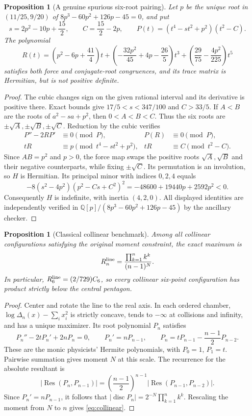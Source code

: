 \documentclass[11pt]{article}
\newtheorem{proposition}[theorem]{Proposition}
\theoremstyle{remark}
\newcommand{\Q}{\mathbb Q}
\numberwithin{equation}{section}
\begin{document}
\begin{proposition}[A genuine spurious six-root pairing]
Let $p$ be the unique root in $(11/25,9/20)$ of
$8p^3-60p^2+126p-45=0$, and put
\[
 s=2p^2-10p+\frac{15}{2},\qquad C=\frac{15}{2}-2p,
 \qquad P(t)=(t^4-st^2+p^2)(t^2-C).
\]
The polynomial
\[
 R(t)=\left(p^2-6p+\frac{41}{4}\right)t
   +\left(-\frac{32p^2}{45}+4p-\frac{26}{5}\right)t^3
   +\left(\frac{29}{75}-\frac{4p^2}{225}\right)t^5
\]
satisfies both force and conjugate-root congruences, and its trace
matrix is Hermitian, but is not positive definite.
\end{proposition}
\begin{proof}
The cubic changes sign on the given rational interval and its
 derivative is positive there. Exact bounds give
$17/5<s<347/100$ and $C>33/5$.
If $A<B$ are the roots of $a^2-sa+p^2$, then $0<A<B<C$.
Thus the six roots are $\pm\sqrt A,\pm\sqrt B,\pm\sqrt C$.
Reduction by the cubic verifies
\begin{align*}
 P''-2RP'&\equiv0\pmod P,&P(R)&\equiv0\pmod P,\\
 tR&\equiv p\pmod{t^4-st^2+p^2},&
 tR&\equiv C\pmod{t^2-C}.
\end{align*}
Since $AB=p^2$ and $p>0$, the force map swaps the positive roots
$\sqrt A,\sqrt B$ and their negative counterparts, while fixing
$\pm\sqrt C$. Its permutation is an involution, so $H$ is Hermitian.
Its principal minor with indices $0,2,4$ equals
\[
 -8(s^2-4p^2)(p^2-Cs+C^2)^2
       =-48600+19440p+2592p^2<0.
\]
Consequently $H$ is indefinite, with inertia $(4,2,0)$.
All displayed identities are independently verified in
$\Q[p]/(8p^3-60p^2+126p-45)$ by the ancillary checker.
\end{proof}

\begin{proposition}[Classical collinear benchmark]\label{prop:collinear}
Among all collinear configurations satisfying the original moment
constraint, the exact maximum is
\begin{equation}\label{eq:collinear}
 R_n^{\rm line}=\frac{\prod_{k=1}^n k^k}{(n-1)^N}.
\end{equation}
In particular, $R_6^{\rm line}=(2/729)C_6$, so every collinear
six-point configuration has product strictly below the central pentagon.
\end{proposition}
\begin{proof}
Center and rotate the line to the real axis. In each ordered chamber,
$\log\Delta_n(x)-\sum_i x_i^2$ is strictly concave, tends to $-\infty$
at collisions and infinity, and has a unique maximizer. Its root
polynomial $P_n$ satisfies
\[
 P_n''-2tP_n'+2nP_n=0,\qquad
 P_n'=nP_{n-1},\qquad
 P_n=tP_{n-1}-\frac{n-1}{2}P_{n-2}.
\]
These are the monic physicists' Hermite polynomials, with $P_0=1$,
$P_1=t$. Pairwise summation gives moment $N$ at this scale.
The recurrence for the absolute resultant is
\[
 |\operatorname{Res}(P_n,P_{n-1})|
 =\left(\frac{n-1}{2}\right)^{n-1}
     |\operatorname{Res}(P_{n-1},P_{n-2})|.
\]
Since $P_n'=nP_{n-1}$, it follows that
$|\operatorname{disc}P_n|=2^{-N}\prod_{k=1}^n k^k$.
Rescaling the moment from $N$ to $n$ gives \eqref{eq:collinear}.
\end{proof}
\end{document}
